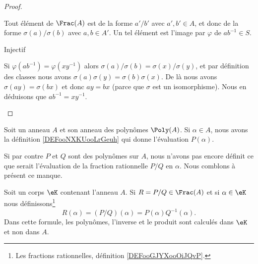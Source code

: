 \begin{proof}
\begin{subproof}
            Tout élément de \( \Frac(A)\) est de la forme \( a'/b'\) avec \( a',b'\in A\), et donc de la forme \( \sigma(a)/\sigma(b)\) avec \( a,b\in A'\). Un tel élément est l'image par \( \varphi\) de \( ab^{-1}\in S\).

        \item[Injectif]

            Si \( \varphi(ab^{-1})=\varphi(xy^{-1})\) alors \( \sigma(a)/\sigma(b)=\sigma(x)/\sigma(y)\), et par définition des classes nous avons \( \sigma(a)\sigma(y)=\sigma(b)\sigma(x)\). De là nous avons \( \sigma(ay)=\sigma(bx)\) et donc \( ay=bx\) (parce que \( \sigma\) est un isomorphisme). Nous en déduisons que \( ab^{-1}=xy^{-1}\).
    \end{subproof}
\end{proof}

\begin{normaltext}
    Soit un anneau \( A\) et son anneau des polynômes \( \Poly(A)\). Si \( \alpha\in A\), nous avons la définition \ref{DEFooNXKUooLrGeuh} qui donne l'évaluation \( P(\alpha)\).

    Si par contre \( P\) et \( Q\) sont des polynômes sur \( A\), nous n'avons pas encore définit ce que serait l'évaluation de la fraction rationnelle \( P/Q\) en \( \alpha\). Nous comblons à présent ce manque.
\end{normaltext}

\begin{definition}       \label{DEFooLBIWooCPCaSY}
    Soit un corps \( \eK\) contenant l'anneau \( A\). Si \( R=P/Q\in \Frac(A)\) et si \( \alpha\in \eK\) nous définissons\footnote{Les fractions rationnelles, définition \ref{DEFooGJYXooOiJQvP}.}
    \begin{equation}
        R(\alpha)=(P/Q)(\alpha)=P(\alpha)Q^{-1}(\alpha).
    \end{equation}
    Dans cette formule, les polynômes, l'inverse et le produit sont calculés dans \( \eK\) et non dans \( A\).
\end{definition}

